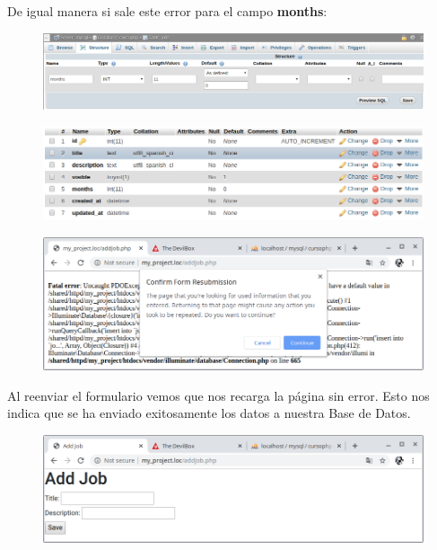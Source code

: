 \documentclass{article}
\begin{document}
De igual manera si sale este error para el campo \textbf{months}:\\

\begin{figure}[h!]
  \centering
  \includegraphics[scale=0.5]{./Pictures/086_month_default.png}
\end{figure}

\newpage

\begin{figure}[h!]
  \centering
  \includegraphics[scale=0.5]{./Pictures/087_estructura_jobs.png}
\end{figure}

\begin{figure}[h!]
  \centering
  \includegraphics[scale=0.5]{./Pictures/088_reenvio_form.png}
\end{figure}

Al reenviar el formulario vemos que nos recarga la página sin error. Esto nos
indica que se ha enviado exitosamente los datos a nuestra Base de Datos.\\

\begin{figure}[h!]
  \centering
  \includegraphics[scale=0.5]{./Pictures/089_envio_exitoso.png}
\end{figure}
\end{document}
